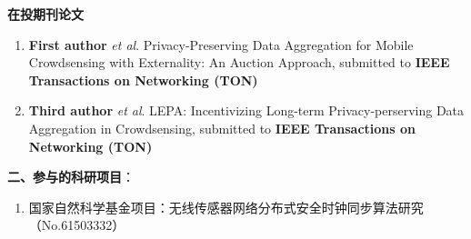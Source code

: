 \textbf{{在投期刊论文}}
\begin{enumerate}
\item \textbf{First author} \emph{et al}. Privacy-Preserving Data Aggregation for Mobile Crowdsensing with Externality: An Auction Approach, submitted to \textbf{IEEE Transactions on Networking (TON)}
\item \textbf{Third author} \emph{et al}. LEPA: Incentivizing Long-term Privacy-perserving Data Aggregation in Crowdsensing, submitted to \textbf{IEEE Transactions on Networking (TON)}
\end{enumerate}




\textbf{二、参与的科研项目}：

\begin{enumerate}

\item 国家自然科学基金项目：无线传感器网络分布式安全时钟同步算法研究
    （No.61503332）

\end{enumerate}

